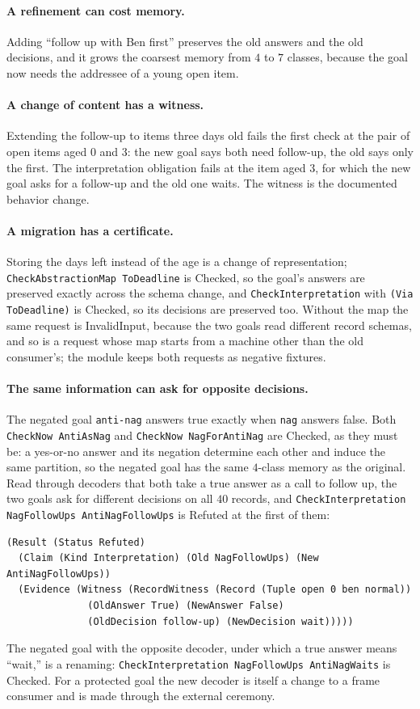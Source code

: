 \documentclass[11pt]{article}
\newcommand{\code}[1]{\texttt{#1}}
\theoremstyle{definition}
\theoremstyle{plain}
\begin{document}
\paragraph{A refinement can cost memory.} Adding ``follow up with Ben first'' preserves the old
answers and the old decisions, and it grows the coarsest memory from $4$ to $7$ classes, because the
goal now needs the addressee of a young open item.

\paragraph{A change of content has a witness.} Extending the follow-up to items three days old fails
the first check at the pair of open items aged $0$ and $3$: the new goal says both need follow-up,
the old says only the first. The interpretation obligation fails at the item aged $3$, for which
the new goal asks for a follow-up and the old one waits. The witness is the documented behavior
change.

\paragraph{A migration has a certificate.} Storing the days left instead of the age is a change of
representation; \code{CheckAbstractionMap ToDeadline} is Checked, so the goal's answers are
preserved exactly across the schema change, and \code{CheckInterpretation} with
\code{(Via ToDeadline)} is Checked, so its decisions are preserved too. Without the map the same
request is InvalidInput, because the two goals read different record schemas, and so is a request
whose map starts from a machine other than the old consumer's; the module keeps both requests as
negative fixtures.

\paragraph{The same information can ask for opposite decisions.} The negated goal \code{anti-nag}
answers true exactly when \code{nag} answers false. Both \code{CheckNow AntiAsNag} and
\code{CheckNow NagForAntiNag} are Checked, as they must be: a yes-or-no answer and its negation
determine each other and induce the same partition, so the negated goal has the same $4$-class
memory as the original. Read through decoders that both take a true answer as a call to follow up,
the two goals ask for different decisions on all $40$ records, and
\code{CheckInterpretation NagFollowUps AntiNagFollowUps} is Refuted at the first of them:
\begin{lstlisting}
(Result (Status Refuted)
  (Claim (Kind Interpretation) (Old NagFollowUps) (New AntiNagFollowUps))
  (Evidence (Witness (RecordWitness (Record (Tuple open 0 ben normal))
              (OldAnswer True) (NewAnswer False)
              (OldDecision follow-up) (NewDecision wait)))))
\end{lstlisting}
The negated goal with the opposite decoder, under which a true answer means ``wait,'' is a renaming:
\code{CheckInterpretation NagFollowUps AntiNagWaits} is Checked. For a protected goal the new
decoder is itself a change to a frame consumer and is made through the external ceremony.
\end{document}
